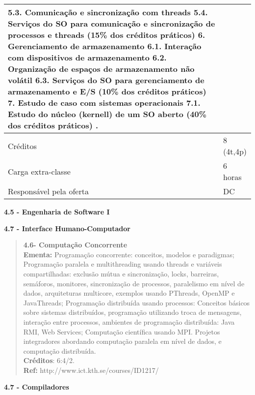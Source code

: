\begin{center}
\begin{tabular}{|p{4.5cm}|p{10.0cm}|}
	5.3. Comunicação e sincronização com threads
	5.4. Serviços do SO para comunicação e sincronização de processos e threads (15\% dos créditos práticos)
6. Gerenciamento de armazenamento
	6.1. Interação com dispositivos de armazenamento
	6.2. Organização de espaços de armazenamento não volátil
	6.3. Serviços do SO para gerenciamento de armazenamento e E/S (10\% dos créditos práticos)
7. Estudo de caso com sistemas operacionais
	7.1. Estudo do núcleo (kernell) de um SO aberto (40\% dos créditos práticos)
. \\ \hline
Créditos & 8 (4t,4p) \\ \hline
Carga extra-classe & 6 horas \\ \hline
Responsável pela oferta & DC \\ \hline
\end{tabular}
\end{center}



\textbf{4.5 - Engenharia de Software I}




\textbf{4.7 - Interface Humano-Computador}








\begin{quote}
\textbf{4.6- Computação Concorrente}
\\  
\textbf{Ementa:} Programação concorrente: conceitos, modelos e paradigmas; Programação paralela e multithreading usando threads e variáveis compartilhadas: exclusão mútua e sincronização, locks, barreiras, semáforos, monitores, sincronização de processos, paralelismo em nível de dados, arquiteturas multicore, exemplos usando PThreads, OpenMP e JavaThreads; Programação distribuída  usando processos: Conceitos básicos sobre sistemas distribuídos, programação utilizando troca de mensagens, interação entre processos, ambientes de programação distribuída:  Java RMI, Web Services; Computação científica usando MPI.  Projetos integradores abordando computação paralela em nível de dados, e computação distribuída.
\\
\textbf{Créditos}: 6:4/2.
\\
\textbf{Ref:} http://www.ict.kth.se/courses/ID1217/
\end{quote}



\textbf{4.7 - Compiladores}



